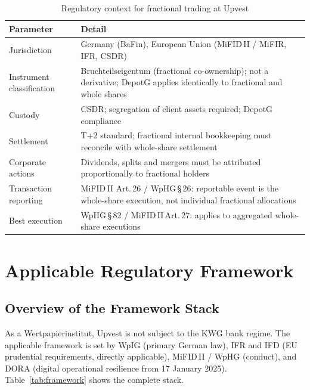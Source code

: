 \documentclass[12pt,a4paper]{report}
\begin{document}
\begin{table}[H]
\caption{Regulatory context for fractional trading at Upvest}
\label{tab:regcontext}
\small
\begin{tabularx}{\textwidth}{@{}L{3.2cm}X@{}}
\toprule
\textbf{Parameter} & \textbf{Detail} \\
\midrule
Jurisdiction & Germany (BaFin), European Union (MiFID\,II / MiFIR, IFR, CSDR) \\[4pt]
Instrument classification & Bruchteilseigentum (fractional co-ownership); not a derivative;
  DepotG applies identically to fractional and whole shares \\[4pt]
Custody & CSDR; segregation of client assets required; DepotG compliance \\[4pt]
Settlement & T+2 standard; fractional internal bookkeeping must reconcile with
  whole-share settlement \\[4pt]
Corporate actions & Dividends, splits and mergers must be attributed proportionally to
  fractional holders \\[4pt]
Transaction reporting & MiFID\,II Art.\,26 / WpHG\,\S\,26: reportable event is the
  whole-share execution, not individual fractional allocations \\[4pt]
Best execution & WpHG\,\S\,82 / MiFID\,II\,Art.\,27: applies to aggregated
  whole-share executions \\
\bottomrule
\end{tabularx}
\end{table}

\chapter{Applicable Regulatory Framework}

\section{Overview of the Framework Stack}

As a Wertpapierinstitut, Upvest is not subject to the KWG bank regime. The applicable
framework is set by WpIG (primary German law), IFR and IFD (EU prudential requirements,
directly applicable), MiFID\,II / WpHG (conduct), and DORA (digital operational
resilience from 17 January 2025). Table~\ref{tab:framework} shows the complete stack.
\end{document}
